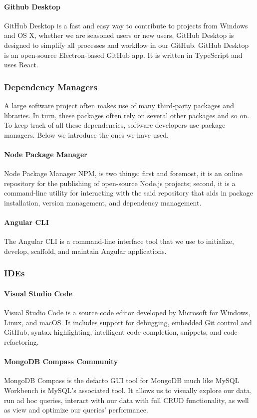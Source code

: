 \paragraph*{Github Desktop}
GitHub Desktop is a fast and easy way to contribute to projects from Windows and OS X, whether we are seasoned users or new users, GitHub Desktop is designed to simplify all processes and workflow in our GitHub. GitHub Desktop is an open-source Electron-based GitHub app. It is written in TypeScript and uses React.


\subsubsection{Dependency Managers}
A large software project often makes use of many third-party packages and libraries. In turn, these packages
often rely on several other packages and so on. To keep track of all these dependencies, software developers
use package managers. Below we introduce the ones we have used.
\paragraph*{Node Package Manager}
Node Package Manager \ac{NPM}, is two things: first and foremost, it is an online repository for the publishing of open-source Node.js projects; second, it is a command-line utility for interacting with the said repository that aids in package installation, version management, and dependency management.
\paragraph*{Angular CLI}
The Angular CLI is a command-line interface tool that we use to initialize, develop, scaffold, and maintain Angular applications. 
\subsubsection{IDEs}

\paragraph*{Visual Studio Code}
Visual Studio Code is a source code editor developed by Microsoft for Windows, Linux, and macOS. It includes support for debugging, embedded Git control and GitHub, syntax highlighting, intelligent code completion, snippets, and code refactoring.


\paragraph*{MongoDB Compass Community}
MongoDB Compass is the defacto GUI tool for MongoDB much like MySQL Workbench is MySQL’s associated tool. It allows us to visually explore our data, run ad hoc queries, interact with our data with full CRUD functionality, as well as view and optimize our queries’ performance.


